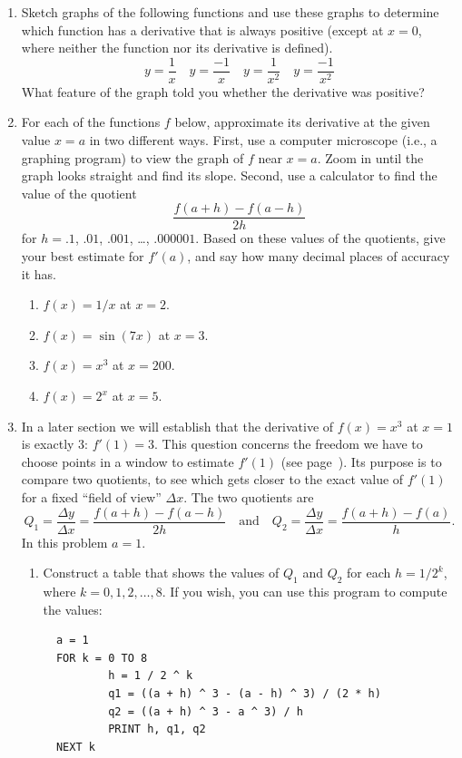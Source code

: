 \begin{enumerate}
\item Sketch graphs of the following functions and use these graphs to
determine which function has a derivative that is always positive
(except at $x = 0$, where neither the function nor its derivative is
defined).
	\[
y = \dfrac{1}{x} \quad    y = \dfrac{-1}{x} 
		\quad   y = \dfrac{1}{x^2}     
		\quad y = \dfrac{-1}{x^2}
\]
What feature of the graph told you whether the derivative was positive?


\item For each of the functions $f$ below, approximate its derivative
at the given value $x = a$ in two different ways.  First, use a
computer microscope (i.e., a graphing program) to view the graph of
$f$ near $x = a$.  Zoom in until the graph looks straight and find its
slope.  Second, use a calculator to find the value of the quotient
\[
\frac{f(a+ h) - f(a - h)}{2h}
\]
for $h = .1$, $.01$, $.001$, \ldots, $.000001$.  Based on these values
of the quotients, give your best estimate for $f'(a)$, and say how
many decimal places of accuracy it has.  





  \begin{enumerate}
  \item $f(x) = 1/x$ at $x = 2$.

  \item $f(x) = \sin(7x)$ at $x = 3$.

  \item $f(x) = x^3$ at $x = 200$.

  \item $f(x) = 2^x$ at $x = 5$.


\end{enumerate}
\item In a later section we will establish that the derivative of $f(x)
= x^3$ at $x = 1$ is exactly 3: $f'(1) = 3$.  This question concerns
the freedom we have to choose points in a window to estimate $f'(1)$
(see page~\pageref{window}).  Its purpose is to compare two quotients,
to see which gets closer to the exact value of $f'(1)$ for a fixed
``field of view'' $\Delta x$.  The two quotients are
\[
Q_1 = \dfrac{\Delta y}{\Delta x} = 
		\dfrac{f(a + h) - f(a - h)}{2h} \quad \mbox{and} 
\quad Q_2 = \dfrac{\Delta y}{\Delta x} = 
		\dfrac{f(a + h) - f(a)}{h}.
\]
In this problem $a = 1$.

  \begin{enumerate}
  \item Construct a table that shows the values of $Q_1$ and $Q_2$ for
each $h = 1/2^k$, where $k = 0, 1, 2, \ldots, 8$.  If you wish, you
can use this program to compute the values:
\begin{verbatim}
  a = 1
  FOR k = 0 TO 8
          h = 1 / 2 ^ k
          q1 = ((a + h) ^ 3 - (a - h) ^ 3) / (2 * h)
          q2 = ((a + h) ^ 3 - a ^ 3) / h
          PRINT h, q1, q2
  NEXT k
\end{verbatim}



\end{enumerate}
\end{enumerate}
